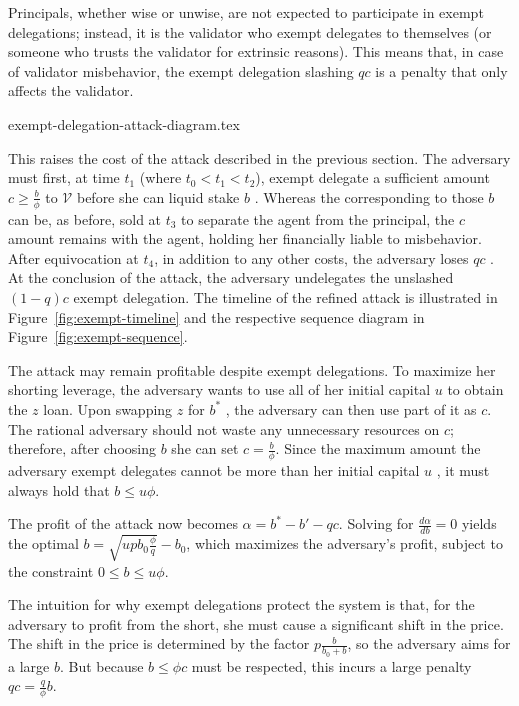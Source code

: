 Principals, whether wise or unwise, are not expected to participate in exempt
delegations; instead, it is the validator who exempt delegates to
themselves (or someone who trusts the validator for extrinsic reasons).
This means that, in case of validator misbehavior, the exempt delegation
slashing $qc$ is a penalty that only affects the validator.

\iflncs
  {exempt-delegation-attack-diagram.tex}
\fi

This raises
the cost of the attack described in the previous section. The
adversary must first, at time $t_1$ (where $t_0 < t_1 < t_2$), exempt delegate a sufficient amount
$c \geq \frac{b}{\phi}$ \asset to $\mathcal{V}$ before she can liquid stake $b$ \asset.
Whereas the \stassets
corresponding to those $b$ \assets can be, as before, sold at $t_3$ to
separate the agent from the principal, the $c$ amount remains with the
agent, holding her financially liable to misbehavior. After equivocation at $t_4$,
in addition to any other costs, the adversary loses $qc$ \asset. At the conclusion
of the attack, the adversary undelegates the unslashed $(1 - q)c$ \asset exempt delegation.
The timeline of the refined attack is illustrated in Figure~\ref{fig:exempt-timeline}
and the respective sequence diagram in Figure~\ref{fig:exempt-sequence}.

The attack may remain profitable despite exempt delegations.
To maximize her shorting leverage, the adversary wants to use all
of her initial capital $u$ \asset to obtain the $z$ \stasset loan.
Upon swapping $z$ for $b^*$ \asset, the adversary can then use part of it as $c$.
The rational adversary should not waste any unnecessary resources on
$c$; therefore, after choosing $b$ she can set $c = \frac{b}{\phi}$.
Since the maximum amount the adversary exempt delegates
cannot be more than her initial capital $u$ \asset,
it must always hold that $b \leq u\phi$.

The profit of the attack now becomes $\alpha = b^* - b' - qc$.
Solving for $\frac{d\alpha}{db} = 0$ yields the optimal $b = \sqrt{u p b_0 \frac{\phi}{q}} - b_0$,
which maximizes
the adversary's profit, subject to the constraint
$0 \leq b \leq u\phi$.

The intuition for why exempt delegations protect the system is that,
for the adversary to profit from the short, she must cause a significant
shift in the price. The shift in the price is determined by the factor
$p\frac{b}{b_0 + b}$, so the adversary aims for a large $b$. But because $b \leq \phi c$
must be respected, this incurs a large penalty $qc = \frac{q}{\phi}b$.


